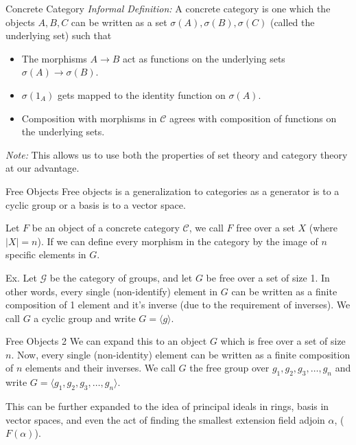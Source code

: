 \documentclass[12pt]{beamer}
\begin{document}
\begin{frame}{Concrete Category}
    \textit{Informal Definition:} A concrete category is one which the objects $A,B,C$ can be written as a set $\sigma(A),\sigma(B),\sigma(C)$ (called the underlying set) such that
    \begin{itemize}
        \item The morphisms $A\rightarrow B$ act as functions on the underlying sets $\sigma(A)\rightarrow \sigma(B)$.
        \item $\sigma(1_A)$ gets mapped to the identity function on $\sigma(A)$.
        \item Composition with morphisms in $\mathscr{C}$ agrees with composition of functions on the underlying sets.
    \end{itemize} 
    
    \quad
    
    \textit{Note:} This allows us to use both the properties of set theory and category theory at our advantage.
\end{frame}

\begin{frame}{Free Objects}
    Free objects is a generalization to categories as a generator is to a cyclic group or a basis is to a vector space.
    
    \quad
    
    Let $F$ be an object of a concrete category $\mathscr{C}$, we call $F$ free over a set $X$ (where $\lvert X\rvert=n$). If we can define every morphism in the category by the image of $n$ specific elements in $G$.
    
    \quad
    
    Ex. Let $\mathcal{G}$ be the category of groups, and let $G$ be free over a set of size 1. In other words, every single (non-identify) element in $G$ can be written as a finite composition of 1 element and it's inverse (due to the requirement of inverses). We call $G$ a cyclic group and write $G=\langle g\rangle$.
\end{frame}

\begin{frame}{Free Objects 2}
    We can expand this to an object $G$ which is free over a set of size $n$. Now, every single (non-identity) element can be written as a finite composition of $n$ elements and their inverses. We call $G$ the free group over $g_1,g_2,g_3,\dots,g_n$ and write $G=\langle g_1,g_2,g_3,\dots,g_n\rangle$.
    
    \quad
    
    This can be further expanded to the idea of principal ideals in rings, basis in vector spaces, and even the act of finding the smallest extension field adjoin $\alpha$, ($F(\alpha)$).
    
\end{frame}
\end{document}
